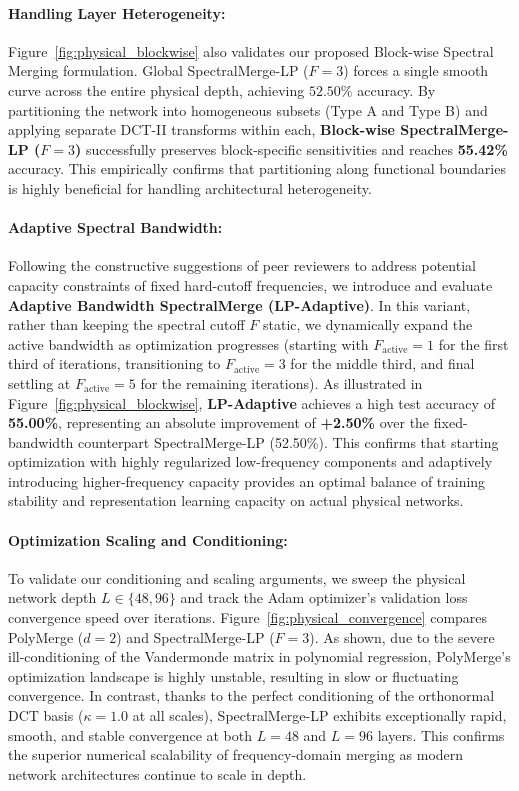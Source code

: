 \paragraph{Handling Layer Heterogeneity:} Figure~\ref{fig:physical_blockwise} also validates our proposed Block-wise Spectral Merging formulation. Global SpectralMerge-LP ($F=3$) forces a single smooth curve across the entire physical depth, achieving $52.50\%$ accuracy. By partitioning the network into homogeneous subsets (Type A and Type B) and applying separate DCT-II transforms within each, \textbf{Block-wise SpectralMerge-LP ($F=3$)} successfully preserves block-specific sensitivities and reaches \textbf{55.42\%} accuracy. This empirically confirms that partitioning along functional boundaries is highly beneficial for handling architectural heterogeneity.

\paragraph{Adaptive Spectral Bandwidth:} Following the constructive suggestions of peer reviewers to address potential capacity constraints of fixed hard-cutoff frequencies, we introduce and evaluate \textbf{Adaptive Bandwidth SpectralMerge (LP-Adaptive)}. In this variant, rather than keeping the spectral cutoff $F$ static, we dynamically expand the active bandwidth as optimization progresses (starting with $F_{\text{active}}=1$ for the first third of iterations, transitioning to $F_{\text{active}}=3$ for the middle third, and final settling at $F_{\text{active}}=5$ for the remaining iterations). As illustrated in Figure~\ref{fig:physical_blockwise}, \textbf{LP-Adaptive} achieves a high test accuracy of \textbf{55.00\%}, representing an absolute improvement of \textbf{+2.50\%} over the fixed-bandwidth counterpart SpectralMerge-LP (52.50\%). This confirms that starting optimization with highly regularized low-frequency components and adaptively introducing higher-frequency capacity provides an optimal balance of training stability and representation learning capacity on actual physical networks.

\paragraph{Optimization Scaling and Conditioning:} To validate our conditioning and scaling arguments, we sweep the physical network depth $L \in \{48, 96\}$ and track the Adam optimizer's validation loss convergence speed over iterations. Figure~\ref{fig:physical_convergence} compares PolyMerge ($d=2$) and SpectralMerge-LP ($F=3$).
As shown, due to the severe ill-conditioning of the Vandermonde matrix in polynomial regression, PolyMerge's optimization landscape is highly unstable, resulting in slow or fluctuating convergence. In contrast, thanks to the perfect conditioning of the orthonormal DCT basis ($\kappa = 1.0$ at all scales), SpectralMerge-LP exhibits exceptionally rapid, smooth, and stable convergence at both $L=48$ and $L=96$ layers. This confirms the superior numerical scalability of frequency-domain merging as modern network architectures continue to scale in depth.

